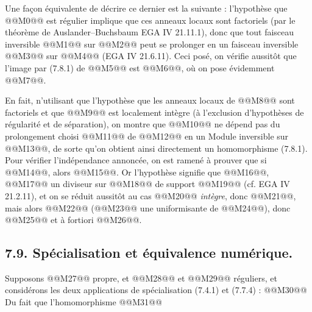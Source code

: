 
Une façon
équivalente de décrire ce dernier est la suivante : l'hypothèse que @@M0@@ est régulier implique que ces anneaux locaux sont factoriels (par le théorème de Auslander--Buchsbaum EGA IV 21.11.1), donc que tout faisceau inversible @@M1@@ sur @@M2@@ peut se prolonger en un faisceau inversible @@M3@@ sur @@M4@@ (EGA IV 21.6.11). Ceci posé, on vérifie aussitôt que l'image par (7.8.1) de @@M5@@ est @@M6@@, où on pose évidemment @@M7@@.

En fait, n'utilisant que l'hypothèse que les anneaux locaux de @@M8@@ sont factoriels et que @@M9@@ est localement intègre (à l'exclusion d'hypothèses de régularité et de séparation), on montre que @@M10@@ ne dépend pas du prolongement choisi @@M11@@ de @@M12@@ en un Module inversible sur @@M13@@, de sorte qu'on obtient ainsi directement un homomorphisme (7.8.1). Pour vérifier l'indépendance annoncée, on est ramené à prouver que si @@M14@@, alors @@M15@@. Or l'hypothèse signifie que @@M16@@, @@M17@@ un diviseur sur @@M18@@ de support @@M19@@ (cf. EGA IV 21.2.11), et on se réduit aussitôt au cas @@M20@@ \emph{intègre}, donc @@M21@@, mais alors @@M22@@ (@@M23@@ une uniformisante de @@M24@@), donc @@M25@@ et à fortiori @@M26@@.

\subsection*{7.9. Spécialisation et équivalence numérique.}
Supposons @@M27@@ propre, et @@M28@@ et @@M29@@ réguliers, et considérons les deux applications de spécialisation (7.4.1) et (7.7.4) :
@@M30@@
Du fait que l'homomorphisme
@@M31@@
